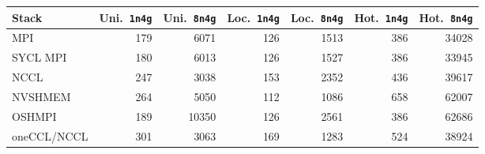 \begin{tabular}{lrrrrrr}
\toprule
Stack & Uni.\ \texttt{1n4g} & Uni.\ \texttt{8n4g} & Loc.\ \texttt{1n4g} & Loc.\ \texttt{8n4g} & Hot.\ \texttt{1n4g} & Hot.\ \texttt{8n4g}\\
\midrule
MPI & 179 & 6071 & 126 & 1513 & 386 & 34028\\
SYCL MPI & 180 & 6013 & 126 & 1527 & 386 & 33945\\
NCCL & 247 & 3038 & 153 & 2352 & 436 & 39617\\
NVSHMEM & 264 & 5050 & 112 & 1086 & 658 & 62007\\
OSHMPI & 189 & 10350 & 126 & 2561 & 386 & 62686\\
oneCCL/NCCL & 301 & 3063 & 169 & 1283 & 524 & 38924\\
\bottomrule
\end{tabular}
